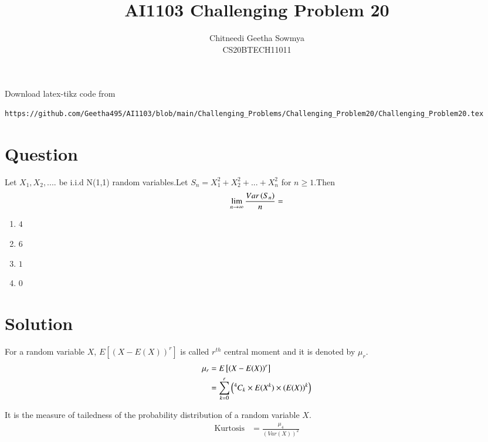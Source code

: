 \documentclass[journal,12pt,twocolumn]{IEEEtran}
\begin{document}
     \def\rightbox#1{\makebox[0in][r]{#1}}
     \def\centbox#1{\makebox[0in]{#1}}
     \def\topbox#1{\raisebox{-\baselineskip}[0in][0in]{#1}}
     \def\midbox#1{\raisebox{-0.5\baselineskip}[0in][0in]{#1}}
\vspace{3cm}
\title{AI1103 Challenging Problem 20}
\author{Chitneedi Geetha Sowmya \\ CS20BTECH11011}
\maketitle
\newpage
\bigskip
\renewcommand{\thefigure}{\theenumi}
\renewcommand{\thetable}{\theenumi}
\newcommand{\dsum}{\displaystyle\sum}
\newcommand{\R}{\mathbb{R}}
\newcommand{\C}{\mathbb{C}}
Download  latex-tikz code from 
%
\begin{lstlisting}
https://github.com/Geetha495/AI1103/blob/main/Challenging_Problems/Challenging_Problem20/Challenging_Problem20.tex\end{lstlisting}

\section{Question}
Let $X_{1},X_{2},....$ be i.i.d N(1,1) random variables.Let $S_{n}=X_{1}^{2}+X_{2}^2+...+X_{n}^{2}$ for $n\ge1$.Then $$\lim_{n \to \infty}{\frac{Var\left(S_{n}\right)}{n}}=$$
\begin{enumerate}[label = (\Alph*)]
\item  $4$
\item  $6$
\item  $1$
\item  $0$
\end{enumerate}
\section{Solution}
\begin{definition}
 For a random variable $X$, $E\left[(X-E(X))^r\right]$ is called $r^{th} $ central moment and it is denoted by $\mu_r$.
\begin{align}
    \mu_r &= E\left[(X-E(X))^r\right] \nonumber\\
    &= \sum_{k=0}^r \left({}^{4}C_{k} \times E(X^k) \times (E(X))^k\right)
    \label{eq:2}
\end{align}
\end{definition}
\begin{definition}[Kurtosis]
 It is the measure of tailedness of the probability distribution of a random variable $X$.
\begin{align*}
    \text{Kurtosis} &= \frac{\mu_4}{( Var(X) )^2}\\
\end{align*}
\end{definition}
 
\end{document}
